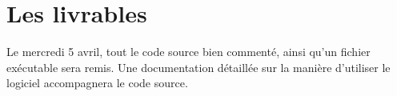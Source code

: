 \documentclass[12pt]{article}
\begin{document}
	\section{Les livrables}
		Le mercredi 5 avril, tout le code source bien commenté, ainsi qu'un fichier exécutable sera remis. Une documentation détaillée sur la manière d'utiliser le logiciel accompagnera le code source.
	\newpage

	
\end{document}
